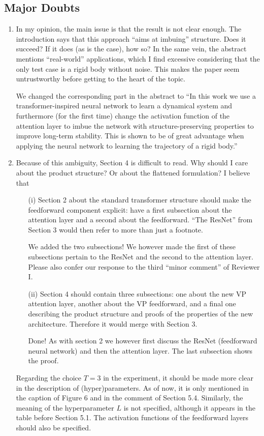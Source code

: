 \documentclass{article}
\begin{document}
\subsection*{Major Doubts}
\begin{enumerate}
    \item In my opinion, the main issue is that the result is not clear enough. The introduction says that this approach ``aims at imbuing'' structure. Does it succeed? If it does (as is the case), how so? In the same vein, the abstract mentions ``real-world'' applications, which I find excessive considering that the only test case is a rigid body without noise. This makes the paper seem untrustworthy before getting to the heart of the topic.
    
    {\color{mred} We changed the corresponding part in the abstract to ``In this work we use a transformer-inspired neural network to learn a dynamical system and furthermore (for the first time) change the activation function of the attention layer to imbue the network with structure-preserving properties to improve long-term stability. This is shown to be of great advantage when applying the neural network to learning the trajectory of a rigid body.''}

    \item Because of this ambiguity, Section 4 is difficult to read. Why should I care about the product structure? Or about the flattened formulation? I believe that 
    \begin{enumerate} 
    \item[(i)] Section 2 about the standard transformer structure should make the feedforward component explicit: have a first subsection about the attention layer and a second about the feedforward. ``The ResNet'' from Section 3 would then refer to more than just a footnote.
    
    {\color{mred} We added the two subsections! We however made the first of these subsections pertain to the ResNet and the second to the attention layer. Please also confer our response to the third ``minor comment'' of Reviewer I.}
    \item[(ii)] Section 4 should contain three subsections: one about the new VP attention layer, another about the VP feedforward, and a final one describing the product structure and proofs of the properties of the new architecture. Therefore it would merge with Section 3.
    
    {\color{mred} Done! As with section 2 we however first discuss the ResNet (feedforward neural network) and then the attention layer. The last subsection shows the proof.}
    \end{enumerate}
    Regarding the choice $T = 3$ in the experiment, it should be made more clear in the description of (hyper)parameters. As of now, it is only mentioned in the caption of Figure 6 and in the comment of Section 5.4. Similarly, the meaning of the hyperparameter $L$ is not specified, although it appears in the table before Section 5.1. The activation functions of the feedforward layers should also be specified.


\end{enumerate}
\end{document}
